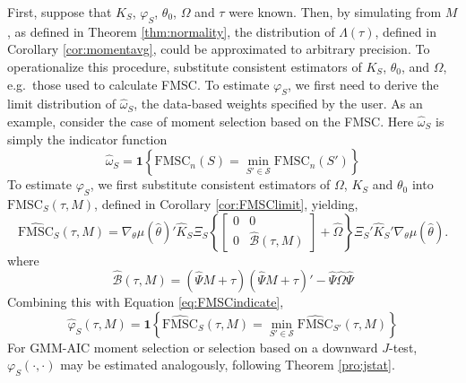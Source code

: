 First, suppose that $K_S$, $\varphi_S$, $\theta_0$, $\Omega$ and $\tau$ were known. 
Then, by simulating from $M$, as defined in Theorem \ref{thm:normality}, the distribution of $\Lambda(\tau)$, defined in Corollary \ref{cor:momentavg}, could be approximated to arbitrary precision. 
To operationalize this procedure, substitute consistent estimators of $K_S$, $\theta_0$, and $\Omega$, e.g.\ those used to calculate FMSC. 
To estimate $\varphi_S$, we first need to derive the limit distribution of $\widehat{\omega}_S$, the data-based weights specified by the user. 
As an example, consider the case of moment selection based on the FMSC. Here $\widehat{\omega}_S$ is simply the indicator function
\begin{equation}
	\label{eq:FMSCindicate}
	\widehat{\omega}_S = \mathbf{1}\left\{\mbox{FMSC}_n(S) = \min_{S'\in \mathscr{S}} \mbox{FMSC}_n(S')\right\}
\end{equation}
To estimate $\varphi_S$, we first substitute consistent estimators of $\Omega$, $K_S$ and $\theta_0$ into $\mbox{FMSC}_S(\tau,M)$, defined in Corollary \ref{cor:FMSClimit}, yielding,
\begin{equation}
	\widehat{\mbox{FMSC}}_S(\tau,M) = \nabla_\theta\mu(\widehat{\theta})'\widehat{K}_S\Xi_S \left\{\left[\begin{array}{cc}0&0\\0&\widehat{\mathcal{B}}(\tau,M) \end{array}\right] + \widehat{\Omega}\right\}\Xi_S'\widehat{K}_S'\nabla_\theta\mu(\widehat{\theta}).
\end{equation}
where
\begin{equation}
	\widehat{\mathcal{B}}(\tau,M) = (\widehat{\Psi} M + \tau)(\widehat{\Psi} M + \tau)' - \widehat{\Psi} \widehat{\Omega} \widehat{\Psi}
\end{equation}
Combining this with Equation \ref{eq:FMSCindicate},
\begin{equation}
\label{eq:omegahat}
	\widehat{\varphi}_S(\tau,M) = \mathbf{1}\left\{\widehat{\mbox{FMSC}}_S(\tau,M) = \min_{S'\in \mathscr{S}} \widehat{\mbox{FMSC}}_{S'}(\tau,M)\right\}
\end{equation}
For GMM-AIC moment selection or selection based on a downward $J$-test, $\varphi_S(\cdot,\cdot)$ may be estimated analogously, following  Theorem \ref{pro:jstat}. 


